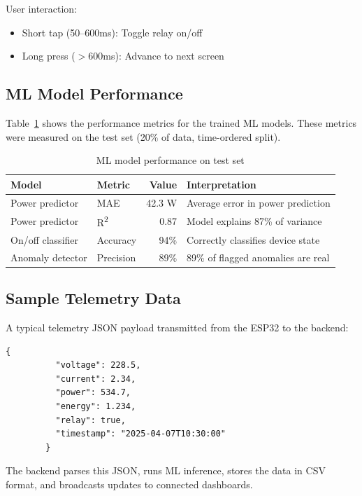\documentclass[12pt, a4paper]{article}
\begin{document}
	User interaction:
	\begin{itemize}[itemsep=2pt, topsep=4pt]
		\item Short tap (50--600ms): Toggle relay on/off
		\item Long press ($>$600ms): Advance to next screen
	\end{itemize}
	
	\subsection{ML Model Performance}
	
	Table~\ref{tab:ml} shows the performance metrics for the trained ML models. These metrics were measured on the test set (20\% of data, time-ordered split).
	
	\begin{table}[H]
		\centering
		\caption{ML model performance on test set}
		\label{tab:ml}
		\vspace{6pt}
		\begin{tabular}{|l|l|r|p{5cm}|}
			\hline
			\textbf{Model} & \textbf{Metric} & \textbf{Value} & \textbf{Interpretation} \\
			\hline
			Power predictor & MAE & 42.3 W & Average error in power prediction \\
			\hline
			Power predictor & R\textsuperscript{2} & 0.87 & Model explains 87\% of variance \\
			\hline
			On/off classifier & Accuracy & 94\% & Correctly classifies device state \\
			\hline
			Anomaly detector & Precision & 89\% & 89\% of flagged anomalies are real \\
			\hline
		\end{tabular}
	\end{table}
	
	\subsection{Sample Telemetry Data}
	
	A typical telemetry JSON payload transmitted from the ESP32 to the backend:
	
	\begin{lstlisting}[basicstyle=\ttfamily\small, frame=single]
		{
		  "voltage": 228.5,
		  "current": 2.34,
		  "power": 534.7,
		  "energy": 1.234,
		  "relay": true,
		  "timestamp": "2025-04-07T10:30:00"
		}
	\end{lstlisting}
	
	The backend parses this JSON, runs ML inference, stores the data in CSV format, and broadcasts updates to connected dashboards.
	
\end{document}
